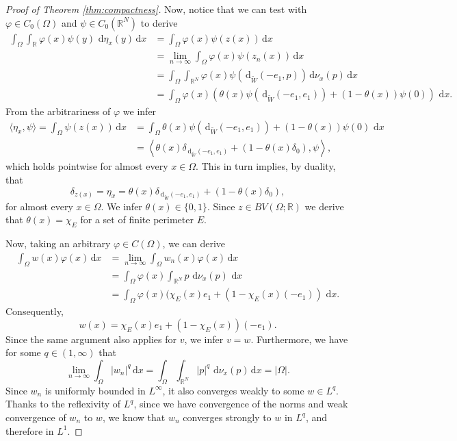 \documentclass[a4paper, 11pt, reqno]{amsart}
\theoremstyle{plain}
\theoremstyle{definition}
\theoremstyle{remark}
\newcommand{\R}{\mathbb R}
\newcommand{\dd}{\,\mathrm{d}}
\begin{document}
\begin{proof}[Proof of Theorem \ref{thm:compactness}]
    Now, notice that we can test with $\varphi \in C_0(\Omega)$ and $\psi \in C_0(\R^N)$ to derive 
    \begin{align*}
        \int_{\Omega} \int_{\R} \varphi(x)\psi(y) \, \dd\eta_x(y) \, \mathrm{d}x &= \int_{\Omega} \varphi(x) \psi(z(x)) \, \mathrm{d}x \\
        &= \lim_{n \to \infty}\int_\Omega \varphi(x)\psi(z_n(x)) \, \mathrm{d}x \\
        &= \int_\Omega \int_{\R^N} \varphi(x) \psi(\dd_{\tilde W}(-e_1, p)) \dd \nu_x(p) \dd x \\
        &= \int_\Omega \varphi(x) (\theta(x) \psi(\dd_{\tilde W}(-e_1, e_1)) + (1-\theta(x))\psi(0)) \, \dd x.
    \end{align*}
    From the arbitrariness of $\varphi$ we infer 
    \begin{align*}
        \langle \eta_x, \psi \rangle = \int_\Omega \psi(z(x)) \, \mathrm{d}x &= \int_\Omega \theta(x) \psi(\dd_{\tilde W}(-e_1, e_1)) + (1-\theta(x))\psi(0) \, \dd x \\
        &= \left\langle \theta(x)\delta_{\dd_{\tilde W}(-e_1, e_1)} + (1 - \theta(x)\delta_0), \psi \right\rangle,
    \end{align*}
    which holds pointwise for almost every $x \in \Omega$. This in turn implies, by duality, that
    \[
        \delta_{z(x)} = \eta_x = \theta(x)\delta_{\dd_{\tilde W}(-e_1, e_1)} + (1 - \theta(x)\delta_0),
    \]
    for almost every $x \in \Omega$. 
    We infer $\theta(x) \in \{0, 1\}$. Since $z \in BV(\Omega; \R)$ we derive that $\theta(x) = \chi_E$ for a set of finite perimeter $E$. 
    
    Now, taking an arbitrary $\varphi \in C(\Omega)$, we can derive 
    \begin{align*}
        \int_\Omega w(x) \varphi(x) \, \mathrm{d}x&= \lim_{n \to \infty} \int_\Omega w_n(x) \varphi(x) \, \mathrm{d}x  \\
        &= \int_\Omega \varphi(x) \int_{\R^N} p \, \dd \nu_x(p) \, \dd x \\
        &= \int_\Omega \varphi(x) (\chi_E(x)e_1 + (1 - \chi_E(x) (-e_1)) \, \dd x.
    \end{align*}
    Consequently, 
    \[
        w(x)= \chi_E(x)e_1 + (1 - \chi_E(x)) (-e_1).
    \]
    Since the same argument also applies for $v$, we infer $v = w$.
    Furthermore, we have for some $q \in (1, \infty)$ that
    \[
        \lim_{n \to \infty} \int_\Omega |w_n|^q \, \mathrm{d}x = \int_{\Omega} \int_{\R^N}|p|^q \, \dd\nu_x(p) \, \mathrm{d}x = |\Omega|.
    \]
    Since $w_n$ is uniformly bounded in $L^\infty$, it also converges weakly to some $w \in L^q$. Thanks to the reflexivity of $L^q$, since we have convergence of the norms and weak convergence of $w_n$ to $w$, we know that $w_n$ converges strongly to $w$ in $L^q$, and therefore in $L^1$. 
    

\end{proof}
\end{document}
